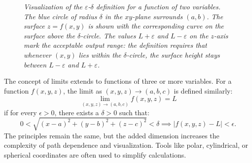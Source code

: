 \begin{figure}[H]
    \caption{\textit{Visualization of the \(\varepsilon\)-\(\delta\) definition for a function of two variables. The blue circle of radius \(\delta\) in the \(xy\)-plane surrounds \((a,b)\). The surface \(z = f(x,y)\) is shown with the corresponding curve on the surface above the \(\delta\)-circle. The values \(L + \varepsilon\) and \(L - \varepsilon\) on the \(z\)-axis mark the acceptable output range: the definition requires that whenever \((x,y)\) lies within the \(\delta\)-circle, the surface height stays between \(L - \varepsilon\) and \(L + \varepsilon\).}}
\end{figure}



\noindent The concept of limits extends to functions of three or more variables. For a function \( f(x, y, z) \), the limit as \( (x, y, z) \to (a, b, c) \) is defined similarly:
\[
\lim_{(x, y, z) \to (a, b, c)} f(x, y, z) = L
\]
if for every \( \epsilon > 0 \), there exists a \( \delta > 0 \) such that:
\[
0 < \sqrt{(x-a)^2 + (y-b)^2 + (z-c)^2} < \delta \implies |f(x, y, z) - L| < \epsilon.
\]
The principles remain the same, but the added dimension increases the complexity of path dependence and visualization. Tools like polar, cylindrical, or spherical coordinates are often used to simplify calculations. \\

